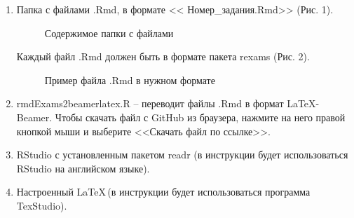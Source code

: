 \documentclass[11pt, a4paper]{extarticle}
\newcommand{\form}[1]{{\color{magenta} #1}}
\begin{document}
\begin{enumerate}
	\item Папка с файлами \form{.Rmd}, в формате <<\form{Номер\_задания.Rmd}>> (Рис. 1).
	\begin{figure}[h!]
		\centering
		\caption{Содержимое папки с файлами}
	\end{figure}

	Каждый файл \form{.Rmd} должен быть в формате пакета \form{rexams} (Рис. 2).
	\begin{figure}[h!]
		\centering
		\caption{Пример файла .Rmd в нужном формате}
	\end{figure}

	\item \form{rmdExams2beamerlatex.R} – переводит файлы \form{.Rmd} в формат \LaTeX-Beamer. Чтобы скачать файл с GitHub из браузера, нажмите на него правой кнопкой мыши и выберите <<Скачать файл по ссылке>>.
	\item \form{RStudio} с установленным пакетом \form{readr} (в инструкции будет использоваться \form{RStudio} на английском языке).
	\item Настроенный \LaTeX \,(в инструкции будет использоваться программа \form{TexStudio}).
\end{enumerate}
\end{document}
